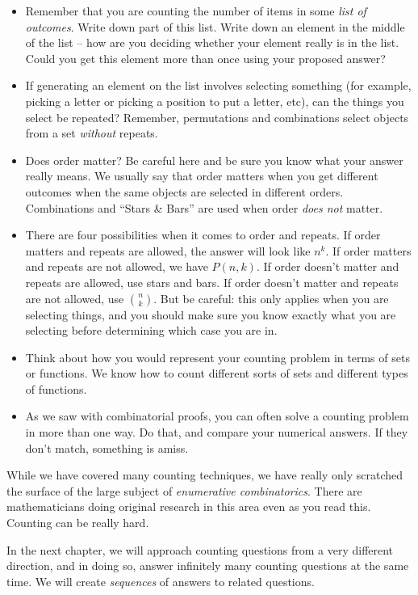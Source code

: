 \documentclass[12pt]{article}
\begin{document}
\begin{itemize}
\item Remember that you are counting the number of items in some \emph{list of outcomes}.  Write down part of this list.  Write down an element in the middle of the list -- how are you deciding whether your element really is in the list.  Could you get this element more than once using your proposed answer?
\item If generating an element on the list involves selecting something (for example, picking a letter or picking a position to put a letter, etc), can the things you select be repeated?  Remember, permutations and combinations select objects from a set \emph{without} repeats.
\item Does order matter?  Be careful here and be sure you know what your answer really means.  We usually say that order matters when you get different outcomes when the same objects are selected in different orders.  Combinations and ``Stars \& Bars'' are used when order {\em does not} matter.
\item There are four possibilities when it comes to order and repeats.  If order matters and repeats are allowed, the answer will look like $n^k$.  If order matters and repeats are not allowed, we have $P(n,k)$.  If order doesn't matter and repeats are allowed, use stars and bars.  If order doesn't matter and repeats are not allowed, use ${n\choose k}$.  But be careful: this only applies when you are selecting things, and you should make sure you know exactly what you are selecting before determining which case you are in.
\item Think about how you would represent your counting problem in terms of sets or functions.  We know how to count different sorts of sets and different types of functions.  %

\item As we saw with combinatorial proofs, you can often solve a counting problem in more than one way.  Do that, and compare your numerical answers.  If they don't match, something is amiss.
\end{itemize}

While we have covered many counting techniques, we have really only scratched the surface of the large subject of \emph{enumerative combinatorics}.  There are mathematicians doing original research in this area even as you read this.  Counting can be really hard.

In the next chapter, we will approach counting questions from a very different direction, and in doing so, answer infinitely many counting questions at the same time.  We will create \emph{sequences} of answers to related questions.  
 
\end{document}
